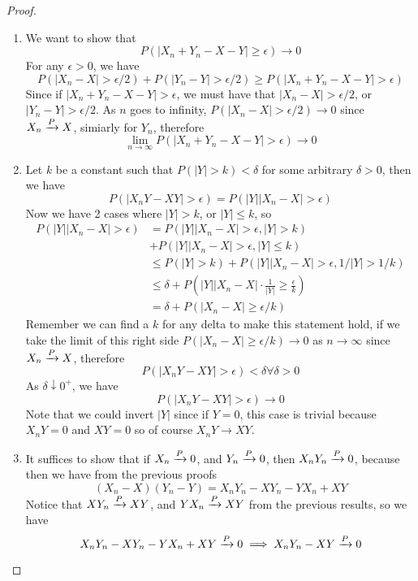 \begin{proof}
    \begin{enumerate}[label=(\roman*)]
        \item We want to show that 
        \[P(|X_n + Y_n - X - Y| \geq \epsilon) \rightarrow 0\]
        For any $\epsilon > 0$, we have 
        \[P(|X_n - X| > \epsilon/2) + P(|Y_n - Y| > \epsilon/2) \geq P(|X_n + Y_n - X - Y| > \epsilon)\]
        Since if $|X_n + Y_n - X - Y| > \epsilon$, we must have that $|X_n - X| > \epsilon/2$, or $|Y_n - Y| > \epsilon/2$.  As $n$ goes to infinity, $P(|X_n - X| > \epsilon/2) \rightarrow 0$ since $X_n \xrightarrow{P} X$, simiarly for $Y_n$, therefore 
        \[\lim_{n\rightarrow\infty}P(|X_n+Y_n- X - Y| > \epsilon) \rightarrow 0\]
        \item Let $k$ be a constant such that $P(|Y| > k) < \delta$ for some arbitrary $\delta > 0$, then we have
        \[P(|X_nY - XY| > \epsilon) = P(|Y||X_n - X| > \epsilon)\]
        Now we have 2 cases where $|Y| > k$, or $|Y| \leq k$, so
        \begin{align*}
            P(|Y||X_n - X| > \epsilon) &= P(|Y||X_n-X| > \epsilon, |Y| > k)\\
            &+ P(|Y||X_n-X| > \epsilon, |Y| \leq k)\\
            &\leq P(|Y| > k) +  P(|Y||X_n-X| > \epsilon, 1/|Y| > 1/k)\\
            &\leq \delta + P\left(|Y||X_n-X|\cdot \frac{1}{|Y|} \geq \frac{\epsilon}{k}\right)\\
            &= \delta + P(|X_n-X| \geq \epsilon/k)
        \end{align*}
        Remember we can find a $k$ for any delta to make this statement hold, if we take the limit of this right side $P(|X_n-X| \geq \epsilon/k) \rightarrow 0$ as $n\rightarrow \infty$ since $X_n \xrightarrow{P} X$, therefore 
        \[P(|X_nY - XY| > \epsilon) < \delta \forall \delta > 0\]
        As $\delta \downarrow 0^+$, we have 
        \[P(|X_nY - XY| > \epsilon) \rightarrow 0\]
        Note that we could invert $|Y|$ since if $Y = 0$, this case is trivial because $X_nY = 0$ and $XY = 0$ so of course $X_nY \rightarrow XY$.
        \item It suffices to show that if $X_n \xrightarrow{P} 0$, and $Y_n \xrightarrow{P} 0$, then $X_nY_n \xrightarrow{P} 0$, because then we have from the previous proofs
        \[(X_n-X)(Y_n-Y) = X_nY_n - XY_n - YX_n + XY \]
        Notice that $XY_n \xrightarrow{P} XY$, and $YX_n \xrightarrow{P} XY$ from the previous results, so we have
        \[X_nY_n - XY_n - YX_n + XY \xrightarrow{P} 0 \implies X_nY_n - XY \xrightarrow{P} 0\]

\end{enumerate}
\end{proof}
